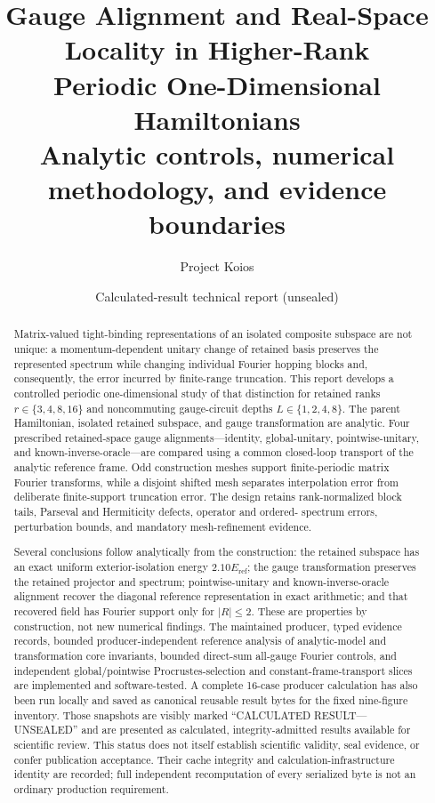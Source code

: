 \documentclass[11pt]{article}
\title{\textbf{Gauge Alignment and Real-Space Locality in Higher-Rank\\Periodic One-Dimensional Hamiltonians}\\
\large Analytic controls, numerical methodology, and evidence boundaries}
\author{Project Koios}
\date{Calculated-result technical report (unsealed)}
\newcommand{\Eref}{E_{\mathrm{ref}}}
\begin{document}
\maketitle

\begin{abstract}
Matrix-valued tight-binding representations of an isolated composite subspace are not
unique: a momentum-dependent unitary change of retained basis preserves the represented
spectrum while changing individual Fourier hopping blocks and, consequently, the error
incurred by finite-range truncation. This report develops a controlled periodic
one-dimensional study of that distinction for retained ranks
$r\in\{3,4,8,16\}$ and noncommuting gauge-circuit depths
$L\in\{1,2,4,8\}$. The parent Hamiltonian, isolated retained subspace, and gauge transformation
are analytic. Four prescribed retained-space gauge alignments---identity,
global-unitary, pointwise-unitary, and known-inverse-oracle---are compared using a common
closed-loop transport of the analytic reference frame. Odd construction meshes support
finite-periodic matrix Fourier transforms, while a disjoint shifted mesh separates
interpolation error from deliberate finite-support truncation error. The design retains
rank-normalized block tails, Parseval and Hermiticity defects, operator and ordered-
spectrum errors, perturbation bounds, and mandatory mesh-refinement evidence.

Several conclusions follow analytically from the construction: the retained subspace has
an exact uniform exterior-isolation energy $2.10\Eref$; the gauge transformation preserves the
retained projector and spectrum; pointwise-unitary and known-inverse-oracle alignment
recover the diagonal reference representation in exact arithmetic; and that recovered
field has Fourier support only for $|R|\leq2$. These are properties by construction, not
new numerical findings. The maintained producer, typed evidence records, bounded
producer-independent reference analysis of analytic-model and transformation core invariants,
bounded direct-sum all-gauge Fourier controls, and independent global/pointwise
Procrustes-selection and constant-frame-transport slices are implemented and
software-tested. A complete 16-case producer calculation has also been run locally and
saved as canonical reusable result bytes for the fixed nine-figure inventory. Those
snapshots are visibly marked ``CALCULATED RESULT---UNSEALED'' and are presented as
calculated, integrity-admitted results available for scientific review. This status does
not itself establish scientific validity, seal evidence, or confer publication
acceptance. Their cache integrity and calculation-infrastructure identity are recorded;
full independent recomputation of every serialized byte is not an ordinary production
requirement.
\end{abstract}
\end{document}
